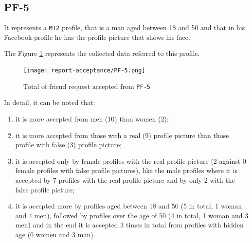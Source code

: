 \subsection*{PF-5}
It represents a \texttt{MT2} profile, that is a man aged between 18 and 50 and that in his Facebook profile he has the profile picture that shows his face.
\par \noindent The Figure \ref{fig:accepted-from-PF5} represents the collected data referred to this profile.
\begin{figure}[H]	
	\centering
	\texttt{[image: report-acceptance/PF-5.png]} 
	\caption{Total of friend request accepted from \texttt{PF-5}}
	\label{fig:accepted-from-PF5}
\end{figure}
\par \noindent In detail, it can be noted that:
\begin{enumerate}
	\item it is more accepted from men (10) than women (2);
	\item it is more accepted from those with a real (9) profile picture than those profile with false (3) profile picture;
	\item it is accepted only by female profiles with the real profile picture (2 against 0 female profiles with false profile pictures), like the male profiles where it is accepted by 7 profiles with the real profile picture and by only 2 with the false profile picture;
	\item it is accepted more by profiles aged between 18 and 50 (5 in total, 1 woman and 4 men), followed by profiles over the age of 50 (4 in total, 1 woman and 3 men) and in the end it is accepted 3 times in total from profiles with hidden age (0 women and 3 man).
\end{enumerate}

